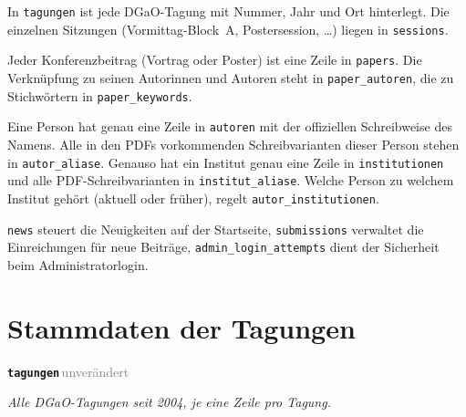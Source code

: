 \documentclass[11pt,a4paper,parskip=half-]{scrartcl}
\newcommand{\tagunv}{\textcolor{gray}{\sffamily\footnotesize\,unverändert\,}}
\newcommand{\tabletitle}[2]{%
  \par\vspace{1.1em}%
  \noindent%
  \begin{tcolorbox}[
    enhanced,
    colback=tabletitlebg,
    colframe=tabletitlebg,
    arc=2pt,
    boxrule=0pt,
    left=10pt, right=10pt, top=4pt, bottom=4pt,
    before skip=0pt, after skip=6pt
  ]
    {\sffamily\large\bfseries\color{white}\texttt{#1}}\hfill{#2}
  \end{tcolorbox}%
  \par\nobreak%
}
\begin{document}
\begin{description}\setlength{\itemsep}{4pt}
  \item[Stammdaten der Tagungen] In \texttt{tagungen} ist jede DGaO-Tagung
        mit Nummer, Jahr und Ort hinterlegt. Die einzelnen Sitzungen
        (Vormittag-Block~A, Postersession, \dots) liegen in
        \texttt{sessions}.
  \item[Beiträge] Jeder Konferenzbeitrag (Vortrag oder Poster) ist eine
        Zeile in \texttt{papers}. Die Verknüpfung zu seinen Autorinnen und
        Autoren steht in \texttt{paper\_autoren}, die zu Stichwörtern in
        \texttt{paper\_keywords}.
  \item[Personen und Institute (neu)] Eine Person hat genau eine Zeile in
        \texttt{autoren} mit der offiziellen Schreibweise des Namens. Alle
        in den PDFs vorkommenden Schreibvarianten dieser Person stehen in
        \texttt{autor\_aliase}. Genauso hat ein Institut genau eine Zeile
        in \texttt{institutionen} und alle PDF-Schreibvarianten in
        \texttt{institut\_aliase}. Welche Person zu welchem Institut
        gehört (aktuell oder früher), regelt
        \texttt{autor\_institutionen}.
  \item[Weiteres] \texttt{news} steuert die Neuigkeiten auf der Startseite,
        \texttt{submissions} verwaltet die Einreichungen für neue Beiträge,
        \texttt{admin\_login\_attempts} dient der Sicherheit beim
        Administratorlogin.
\end{description}

\clearpage

\section{Stammdaten der Tagungen}

\tabletitle{tagungen}{\tagunv}

\textit{Alle DGaO-Tagungen seit 2004, je eine Zeile pro Tagung.}
\end{document}
